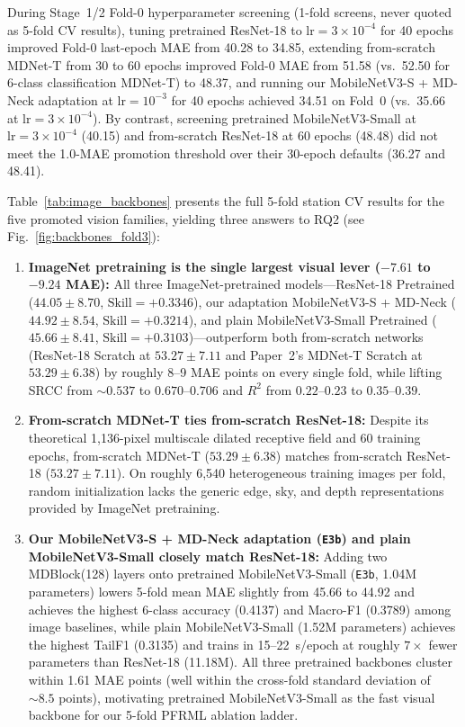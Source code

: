 \documentclass[conference]{IEEEtran}
\begin{document}
During Stage~1/2 Fold-0 hyperparameter screening (1-fold screens, never quoted
as 5-fold CV results), tuning pretrained ResNet-18 to
$\text{lr} = 3 \times 10^{-4}$ for 40 epochs improved Fold-0 last-epoch MAE from
40.28 to 34.85, extending from-scratch MDNet-T from 30 to 60 epochs improved
Fold-0 MAE from 51.58 (vs.\ 52.50 for 6-class classification MDNet-T) to 48.37,
and running our MobileNetV3-S + MD-Neck adaptation at $\text{lr} = 10^{-3}$ for
40 epochs achieved 34.51 on Fold~0 (vs.\ 35.66 at
$\text{lr} = 3 \times 10^{-4}$). By contrast, screening pretrained
MobileNetV3-Small at $\text{lr} = 3 \times 10^{-4}$ (40.15) and from-scratch
ResNet-18 at 60 epochs (48.48) did not meet the 1.0-MAE promotion threshold over
their 30-epoch defaults (36.27 and 48.41).

Table~\ref{tab:image_backbones} presents the full 5-fold station CV results for
the five promoted vision families, yielding three answers to RQ2 (see
Fig.~\ref{fig:backbones_fold3}):
\begin{enumerate}
  \item \textbf{ImageNet pretraining is the single largest visual lever ($-7.61$
        to $-9.24$ MAE):} All three ImageNet-pretrained models---ResNet-18
        Pretrained ($44.05 \pm 8.70$, $\text{Skill} = +0.3346$), our adaptation
        MobileNetV3-S + MD-Neck ($44.92 \pm 8.54$, $\text{Skill} = +0.3214$),
        and plain MobileNetV3-Small Pretrained ($45.66 \pm 8.41$,
        $\text{Skill} = +0.3103$)---outperform both from-scratch networks
        (ResNet-18 Scratch at $53.27 \pm 7.11$ and Paper~2's MDNet-T Scratch at
        $53.29 \pm 6.38$) by roughly 8--9 MAE points on every single fold, while
        lifting SRCC from $\sim 0.537$ to $0.670\text{--}0.706$ and $R^2$ from
        $0.22\text{--}0.23$ to $0.35\text{--}0.39$.
  \item \textbf{From-scratch MDNet-T ties from-scratch ResNet-18:} Despite its
        theoretical 1,136-pixel multiscale dilated receptive field and 60
        training epochs, from-scratch MDNet-T ($53.29 \pm 6.38$) matches
        from-scratch ResNet-18 ($53.27 \pm 7.11$). On roughly 6,540
        heterogeneous training images per fold, random initialization lacks the
        generic edge, sky, and depth representations provided by ImageNet
        pretraining.
  \item \textbf{Our MobileNetV3-S + MD-Neck adaptation (\texttt{E3b}) and plain
        MobileNetV3-Small closely match ResNet-18:} Adding two MDBlock(128)
        layers onto pretrained MobileNetV3-Small (\texttt{E3b}, 1.04M
        parameters) lowers 5-fold mean MAE slightly from 45.66 to 44.92 and
        achieves the highest 6-class accuracy (0.4137) and Macro-F1 (0.3789)
        among image baselines, while plain MobileNetV3-Small (1.52M parameters)
        achieves the highest TailF1 (0.3135) and trains in 15--22~s/epoch at
        roughly $7 \times$ fewer parameters than ResNet-18 (11.18M). All three
        pretrained backbones cluster within 1.61 MAE points (well within the
        cross-fold standard deviation of $\sim 8.5$ points), motivating
        pretrained MobileNetV3-Small as the fast visual backbone for our 5-fold
        PFRML ablation ladder.
\end{enumerate}
\end{document}
